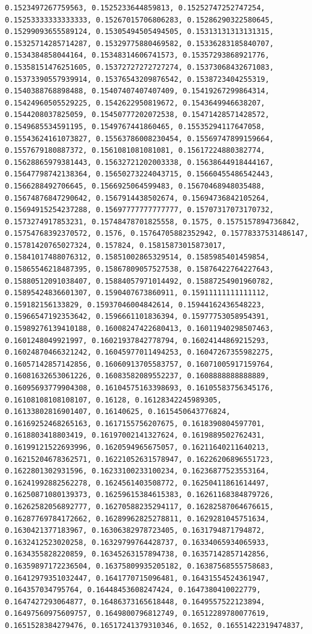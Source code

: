 \documentclass[11pt]{article}
\begin{document}
\begin{Verbatim}[commandchars=\\\{\}]
0.1523497267759563, 0.1525233644859813, 0.15252747252747254, 0.15253333333333333, 0.15267015706806283, 0.15286290322580645, 0.15299093655589124, 0.15305494505494505, 0.15313131313131315, 0.15325714285714287, 0.15329775880469582, 0.15336283185840707, 0.1534384858044164, 0.15348314606741573, 0.15357293868921776, 0.15358151476251605, 0.15372727272727274, 0.15373068432671083, 0.15373390557939914, 0.15376543209876542, 0.1538723404255319, 0.1540388768898488, 0.15407407407407409, 0.15419267299864314, 0.15424960505529225, 0.1542622950819672, 0.1543649946638207, 0.1544208037825059, 0.15450777202072538, 0.15471428571428572, 0.1549685534591195, 0.1549767441860465, 0.15535294117647058, 0.15543624161073827, 0.15563786008230454, 0.15569747899159664, 0.1557679180887372, 0.1561081081081081, 0.15617224880382774, 0.15628865979381443, 0.15632721202003338, 0.15638644918444167, 0.15647798742138364, 0.15650273224043715, 0.15660455486542443, 0.1566288492706645, 0.1566925064599483, 0.15670468948035488, 0.15674876847290642, 0.1567914438502674, 0.15694736842105264, 0.15694915254237288, 0.15697777777777777, 0.15707317073170732, 0.1573274917853231, 0.15748478701825558, 0.1575, 0.1575157894736842, 0.15754768392370572, 0.1576, 0.15764705882352942, 0.15778337531486147, 0.15781420765027324, 0.157824, 0.15815873015873017, 0.15841017488076312, 0.15851002865329514, 0.1585985401459854, 0.15865546218487395, 0.15867809057527538, 0.15876422764227643, 0.15880512091038407, 0.15884057971014492, 0.15887254901960782, 0.15895424836601307, 0.1590407673860911, 0.15911111111111112, 0.159182156133829, 0.15937046004842614, 0.15944162436548223, 0.15966547192353642, 0.1596661101836394, 0.15977753058954391, 0.15989276139410188, 0.16008247422680413, 0.16011940298507463, 0.1601248049921997, 0.16021937842778794, 0.16024144869215293, 0.16024870466321242, 0.16045977011494253, 0.16047267355982275, 0.16057142857142856, 0.16060913705583757, 0.16071005917159764, 0.16081632653061226, 0.16083582089552237, 0.1608888888888889, 0.16095693779904308, 0.16104575163398693, 0.16105583756345176, 0.16108108108108107, 0.16128, 0.16128342245989305, 0.16133802816901407, 0.16140625, 0.1615450643776824, 0.16169252468265163, 0.1617155756207675, 0.1618390804597701, 0.1618803418803419, 0.16197002141327624, 0.1619889502762431, 0.16199121522693996, 0.1620594965675057, 0.16211640211640213, 0.16215204678362571, 0.16221052631578947, 0.16226206896551723, 0.1622801302931596, 0.16233100233100234, 0.16236877523553164, 0.16241992882562278, 0.1624561403508772, 0.16250411861614497, 0.16250871080139373, 0.16259615384615383, 0.16261168384879726, 0.16262582056892777, 0.16270588235294117, 0.16282587064676615, 0.16287769784172662, 0.16289962825278811, 0.1629281045751634, 0.1630421377183967, 0.16306382978723405, 0.1631794871794872, 0.1632412523020258, 0.16329799764428737, 0.16334065934065933, 0.1634355828220859, 0.16345263157894738, 0.16357142857142856, 0.16359897172236504, 0.16375809935205182, 0.16387568555758683, 0.16412979351032447, 0.1641770715096481, 0.16431554524361947, 0.164357034795764, 0.16448453608247424, 0.1647380410022779, 0.1647427293064877, 0.16486373165618448, 0.1649557522123894, 0.16497560975609757, 0.1649800796812749, 0.16512289780077619, 0.1651528384279476, 0.16517241379310346, 0.1652, 0.16551422319474837, 
\end{Verbatim}
\end{document}
